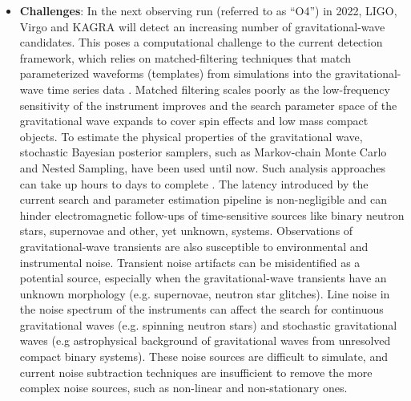 \begin{itemize}
        \item \textbf{Challenges}:
        In the next observing run (referred to as ``O4'') in 2022, LIGO, Virgo and KAGRA will detect an increasing number of gravitational-wave candidates. 
        This poses a computational challenge to the current detection framework, which relies on matched-filtering techniques that match parameterized waveforms (templates) from simulations into the gravitational-wave time series data \cite{PhysRevLett.116.061102, Vas2001, PhysRevD.44.3819}.
        Matched filtering scales poorly as the low-frequency sensitivity of the instrument improves and the search parameter space of the gravitational wave expands to cover spin effects and low mass compact objects.
        To estimate the physical properties of the gravitational wave, stochastic Bayesian posterior samplers, such as Markov-chain Monte Carlo and Nested Sampling, have been used until now. Such analysis approaches can take up hours to days to complete \cite{Abbott_2016}.
        The latency introduced by the current search and parameter estimation pipeline is non-negligible and can hinder electromagnetic follow-ups of time-sensitive sources like binary neutron stars, supernovae and other, yet unknown, systems.
        Observations of gravitational-wave transients are also susceptible to environmental and instrumental noise.
        Transient noise artifacts can be misidentified as a potential source, especially when the gravitational-wave transients have an unknown morphology (e.g. supernovae, neutron star glitches).
        Line noise in the noise spectrum of the instruments can affect the search for  continuous gravitational waves (e.g. spinning neutron stars) and stochastic gravitational waves (e.g astrophysical background of gravitational waves from unresolved compact binary systems).
        These noise sources are difficult to simulate, and current noise subtraction techniques are insufficient to remove the more complex noise sources, such as non-linear and non-stationary ones. 


\end{itemize}
